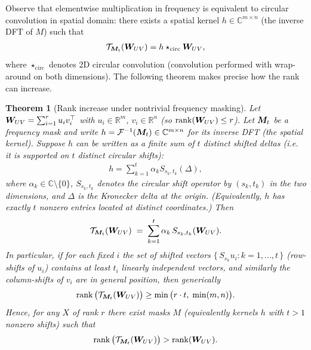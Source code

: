 \documentclass{article}
\theoremstyle{plain}
\newtheorem{theorem}{Theorem}[section]
\theoremstyle{definition}
\theoremstyle{remark}
\begin{document}
Observe that elementwise multiplication in frequency is equivalent to circular convolution in spatial domain: there exists a spatial kernel $h\in\mathbb{C}^{m\times n}$ (the inverse DFT of $M$) such that
\begin{align}
\mathcal{T}_{{\bm{M}}_t}({\bm{W}}_{UV}) = h \star_{\mathrm{circ}} {\bm{W}}_{UV},
\end{align}
where $\star_{\mathrm{circ}}$ denotes 2D circular convolution (convolution performed with wrap-around on both dimensions). The following theorem makes precise how the rank can increase.

\begin{theorem}[Rank increase under nontrivial frequency masking]
\label{thm:rank_increase}
Let ${\bm{W}}_{UV}=\sum_{i=1}^r u_i v_i^\top$ with $u_i\in\mathbb{R}^m$, $v_i\in\mathbb{R}^n$ (so $\operatorname{rank}({\bm{W}}_{UV})\le r$). Let ${\bm{M}}_t$ be a frequency mask and write $h=\mathcal{F}^{-1}({\bm{M}}_t)\in\mathbb{C}^{m\times n}$ for its inverse DFT (the spatial kernel). Suppose $h$ can be written as a finite sum of $t$ distinct shifted deltas (i.e. it is supported on $t$ distinct circular shifts):
\begin{align}
h = \sum_{k=1}^{t} \alpha_k S_{s_k,t_k}(\Delta),
\end{align}
where $\alpha_k\in\mathbb{C}\setminus\{0\}$, $S_{s_k,t_k}$ denotes the circular shift operator by $(s_k,t_k)$ in the two dimensions, and $\Delta$ is the Kronecker delta at the origin. (Equivalently, $h$ has exactly $t$ nonzero entries located at distinct coordinates.) Then
\begin{align}
\mathcal{T}_{{\bm{M}}_t}({\bm{W}}_{UV}) \;=\; \sum_{k=1}^{t} \alpha_k \, S_{s_k,t_k}({\bm{W}}_{UV}).
\end{align}
In particular, if for each fixed $i$ the set of shifted vectors $\{\,S_{s_k} u_i : k=1,\dots,t\,\}$ (row-shifts of $u_i$) contains at least $t_i$ linearly independent vectors, and similarly the column-shifts of $v_i$ are in general position, then generically
\begin{align}
\operatorname{rank}\big(\mathcal{T}_{{\bm{M}}_t}({\bm{W}}_{UV})\big) \ge \min\big( r\cdot t, \; \min(m,n) \big).
\end{align}
Hence, for any $X$ of rank $r$ there exist masks $M$ (equivalently kernels $h$ with $t\!>\!1$ nonzero shifts) such that
\begin{align}
\operatorname{rank}\big(\mathcal{T}_{{\bm{M}}_t}({\bm{W}}_{UV})\big) > \operatorname{rank}({\bm{W}}_{UV}).
\end{align}
\end{theorem}
\end{document}
